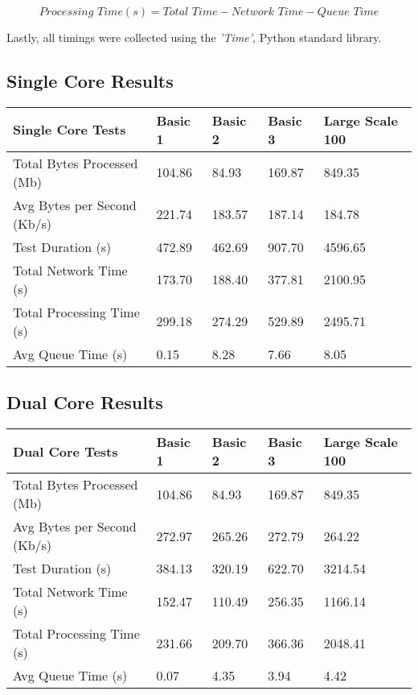 $$\textit{Processing Time}(s)=\textit{Total Time} - \textit{Network Time} - \textit{Queue Time}$$

Lastly, all timings were collected using the \textit{'Time'}, Python standard library. 

\newpage
\subsection{Single Core Results}

\begin{table}[!ht]
    \centering
    \begin{tabular}{|l|l|l|l|l|}
    \hline
        Single Core Tests & Basic 1 & Basic 2 & Basic 3 & Large Scale 100 \\ \hline
        Total Bytes Processed (Mb) & 104.86 & 84.93 & 169.87 & 849.35 \\ \hline
        Avg Bytes per Second (Kb/s) & 221.74 & 183.57 & 187.14 & 184.78 \\ \hline
        Test Duration (s) & 472.89 & 462.69 & 907.70 & 4596.65 \\ \hline
        Total Network Time (s) & 173.70 & 188.40 & 377.81 & 2100.95 \\ \hline
        Total Processing Time (s) & 299.18 & 274.29 & 529.89 & 2495.71 \\ \hline
        Avg Queue Time (s) & 0.15 & 8.28 & 7.66 & 8.05 \\ \hline
    \end{tabular}
\end{table}

\newpage
\subsection{Dual Core Results}

\begin{table}[!ht]
    \centering
    \begin{tabular}{|l|l|l|l|l|}
    \hline
        Dual Core Tests & Basic 1 & Basic 2 & Basic 3 & Large Scale 100 \\ \hline
        Total Bytes Processed (Mb) & 104.86 & 84.93 & 169.87 & 849.35 \\ \hline
        Avg Bytes per Second (Kb/s) & 272.97 & 265.26 & 272.79 & 264.22 \\ \hline
        Test Duration (s) & 384.13 & 320.19 & 622.70 & 3214.54 \\ \hline
        Total Network Time (s) & 152.47 & 110.49 & 256.35 & 1166.14 \\ \hline
        Total Processing Time (s) & 231.66 & 209.70 & 366.36 & 2048.41 \\ \hline
        Avg Queue Time (s) & 0.07 & 4.35 & 3.94 & 4.42 \\ \hline
    \end{tabular}
\end{table}

